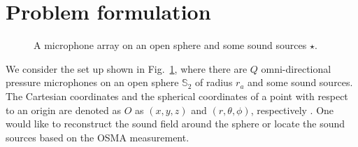 \documentclass[11pt]{article}
\begin{document}
\section{Problem formulation}
\begin{figure}[t]
\centerline{}
\caption{A microphone array on an open sphere and some sound sources $\star$.}
\label{fig:bf}
\end{figure}
We consider the set up shown in Fig.~\ref{fig:bf}, where there are $Q$ omni-directional 
pressure microphones on an open sphere $\mathbb{S}_2$ of radius $r_a$ and some sound sources. 
The Cartesian coordinates and the spherical coordinates of a point 
with respect to an origin are denoted as $O$ as $(x,y,z)$  and $(r,\theta,\phi)$, respectively 
\cite{Rafaely2015}. 
One would like to reconstruct the sound field around the sphere or 
locate the sound sources based on the OSMA measurement.
\end{document}
